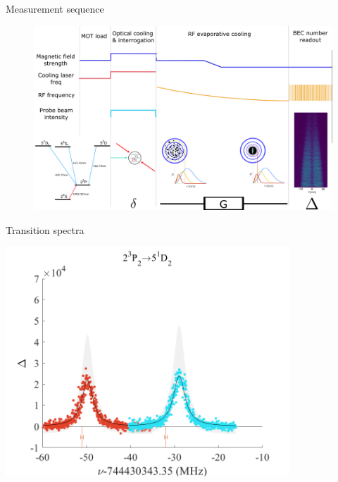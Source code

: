 \documentclass{beamer}
\begin{document}
\begin{frame}{Measurement sequence}
    \begin{figure}
        \centering
        \includegraphics[width=\textwidth]{figures/Spectra/spectroscopy_sequence.png}
        \label{fig:my_label}
    \end{figure}
\end{frame}

\begin{frame}{Transition spectra}
    \begin{center}
        \includegraphics[width=0.8\textwidth]{figures/Spectra/5^1D_2_plot_combo.png}    
    \end{center}
\end{frame}
\end{document}
